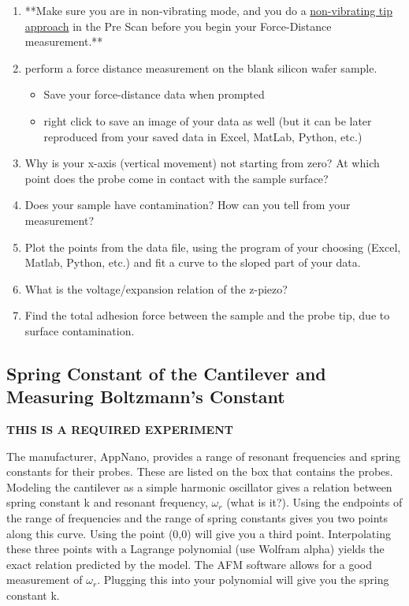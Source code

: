 \documentclass{../lab}
\begin{document}
\begin{enumerate}
    \item **Make sure you are in non-vibrating mode, and you do a \hyperref[subsec:TipApproach]{non-vibrating tip approach} in the Pre Scan before you begin your Force-Distance measurement.**

    \item perform a force distance measurement on the blank silicon wafer sample.

    \begin{itemize}
        \item Save your force-distance data when prompted

        \item right click to save an image of your data as well (but it can be later reproduced from your saved data in Excel, MatLab, Python, etc.)

    \end{itemize}

    \item Why is your x-axis (vertical movement) not starting from zero?  At which point does the probe come in contact with the sample surface?

    \item Does your sample have contamination? How can you tell from your measurement?

    \item Plot the points from the data file, using the program of your choosing (Excel, Matlab, Python, etc.) and fit a curve to the sloped part of your data.

    \item What is the voltage/expansion relation of the z-piezo?

    \item Find the total adhesion force between the sample and the probe tip, due to surface contamination.

\end{enumerate}

\subsection{Spring Constant of the Cantilever and Measuring Boltzmann's Constant}
\label{subsec:Boltzmann}

\textbf{THIS IS A REQUIRED EXPERIMENT}

The manufacturer, AppNano, provides a range of resonant frequencies and spring constants for their probes. These are listed on the box that contains the probes. Modeling the cantilever as a simple harmonic oscillator gives a relation between spring constant k and resonant frequency, $\omega_r$ (what is it?). Using the endpoints of the range of frequencies and the range of spring constants gives you two points along this curve. Using the point (0,0) will give you a third point. Interpolating these three points with a Lagrange polynomial (use Wolfram alpha) yields the exact relation predicted by the model. The AFM software allows for a good measurement of $\omega_r$. Plugging this into your polynomial will give you the spring constant k.
\end{document}
